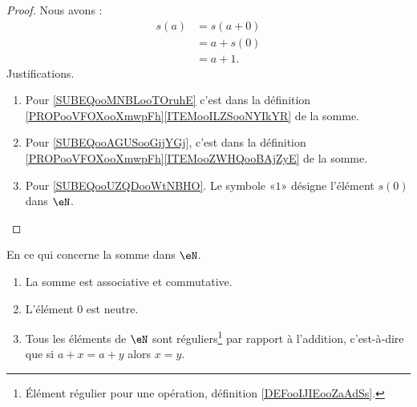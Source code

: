 \begin{proof}
	Nous avons :
	\begin{subequations}
		\begin{align}
			s(a) & =s(a+0)        \label{SUBEQooMNBLooTOruhE} \\
			     & =a+s(0)        \label{SUBEQooAGUSooGijYGj} \\
			     & =a+1.          \label{SUBEQooUZQDooWtNBHO}
		\end{align}
	\end{subequations}
	Justifications.
	\begin{enumerate}
		\item
		      Pour \eqref{SUBEQooMNBLooTOruhE} c'est dans la définition \ref{PROPooVFOXooXmwpFh}\ref{ITEMooILZSooNYIkYR} de la somme.
		\item
		      Pour \eqref{SUBEQooAGUSooGijYGj}, c'est dans la définition \ref{PROPooVFOXooXmwpFh}\ref{ITEMooZWHQooBAjZyE} de la somme.
		\item
		      Pour \eqref{SUBEQooUZQDooWtNBHO}. Le symbole «\( 1\)» désigne l'élément \( s(0)\) dans \( \eN\).
	\end{enumerate}
\end{proof}

\begin{proposition}     \label{PROPooTLTSooGNMTmV}
	En ce qui concerne la somme dans \( \eN\).
	\begin{enumerate}
		\item       \label{ITEMooIFFPooXfftfG}
		      La somme est associative et commutative.
		\item       \label{ITEMooSGRVooPAVFYK}
		      L'élément \( 0\) est neutre.
		\item       \label{ITEMooNUTHooJWWzGv}
		      Tous les éléments de \( \eN\) sont réguliers\footnote{Élément régulier pour une opération, définition \ref{DEFooIJIEooZaAdSs}.} par rapport à l'addition, c'est-à-dire que si \( a+x=a+y\) alors \( x=y\).
	\end{enumerate}
\end{proposition}

